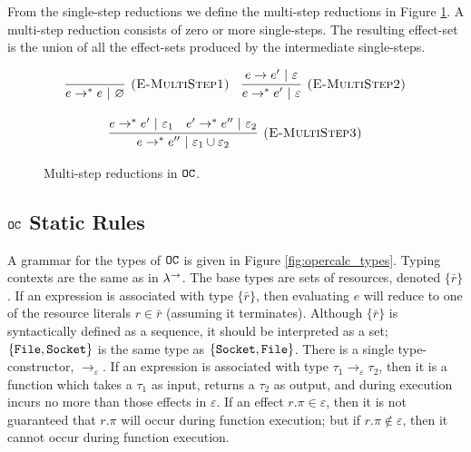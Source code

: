 From the single-step reductions we define the multi-step reductions in Figure \ref{fig:opercalc_multistep_defn}. A multi-step reduction consists of zero or more single-steps. The resulting effect-set is the union of all the effect-sets produced by the intermediate single-steps.

\begin{figure}[h]

\noindent
{}

\[
\begin{array}{c}

\infer[\textsc{(E-MultiStep1)}]
	{ e \rightarrow^{*}  e~|~\varnothing}
	{}
~~~
\infer[\textsc{(E-MultiStep2)}]
	{ e \rightarrow^{*}  e'~|~\varepsilon}
	{ e \rightarrow  e'~|~\varepsilon} \\[3ex]
	
\infer[\textsc{(E-MultiStep3)}]
	{ e \rightarrow^{*}  e''~|~\varepsilon_1 \cup \varepsilon_2}
	{ e \rightarrow^{*}  e'~|~\varepsilon_1 &  e' \rightarrow^{*}  e''~|~\varepsilon_2}
\end{array}
\]

\vspace{-7pt}
\caption{Multi-step reductions in $\mathtt{OC}$.}
\label{fig:opercalc_multistep_defn}
\end{figure}

 
 
 
 
 
 
\subsection{$\mathtt{OC}$ Static Rules}

A grammar for the types of $\mathtt{OC}$ is given in Figure \ref{fig:opercalc_types}. Typing contexts are the same as in $\lambda^{\rightarrow}$. The base types are sets of resources, denoted $\{ \bar r \}$. If an expression is associated with type $\{ \bar r \}$, then evaluating $e$ will reduce to one of the resource literals $r \in \bar r$ (assuming it terminates). Although $\{ \bar r \}$ is syntactically defined as a sequence, it should be interpreted as a set; $\{ \mathtt{File, Socket} \}$ is the same type as $\{ \mathtt{Socket, File} \}$. There is a single type-constructor, $\rightarrow_{\varepsilon}$. If an expression is associated with type $\tau_1 \rightarrow_{\varepsilon} \tau_2$, then it is a function which takes a $\tau_1$ as input, returns a $\tau_2$ as output, and during execution incurs no more than those effects in $\varepsilon$. If an effect $r.\pi \in \varepsilon$, then it is not guaranteed that $r.\pi$ will occur during function execution; but if $r.\pi \notin \varepsilon$, then it cannot occur during function execution.

